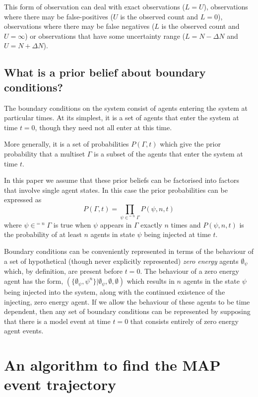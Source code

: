 \documentclass{article}
\begin{document}
This form of observation can deal with exact observations ($L=U$), observations where there may be false-positives ($U$ is the observed count and $L=0$), observations where there may be false negatives ($L$ is the observed count and $U=\infty$) or observations that have some uncertainty range ($L = N - \Delta N$ and $U = N + \Delta N$).
 
\subsection{What is a prior belief about boundary conditions?}

The boundary conditions on the system consist of agents entering the system at particular times. At its simplest, it is a set of agents that enter the system at time $t=0$, though they need not all enter at this time.

More generally, it is a set of probabilities $P(\Gamma,t)$ which give the prior probability that a multiset $\Gamma$ is a subset of the agents that enter the system at time $t$.

In this paper we assume that these prior beliefs can be factorised into factors that involve single agent states. In this case the prior probabilities can be expressed as
\[
P(\Gamma,t) = \prod_{\psi \in^{=n} \Gamma} P(\psi,n,t)
\]
where $\psi\in^{=n}\Gamma$ is true when $\psi$ appears in $\Gamma$ exactly $n$ times and $P(\psi,n,t)$ is the probability of at least $n$ agents in state $\psi$ being injected at time $t$. 

Boundary conditions can be conveniently represented in terms of the behaviour of a set of hypothetical (though never explicitly represented) \textit{zero energy} agents $\emptyset_\psi$ which, by definition, are present before $t=0$. The behaviour of a zero energy agent has the form, $(\{\emptyset_\psi, \psi^n\}|\emptyset_\psi,\emptyset,\emptyset)$ which results in $n$ agents in the state $\psi$ being injected into the system, along with the continued existence of the injecting, zero energy agent. If we allow the behaviour of these agents to be time dependent, then any set of boundary conditions can be represented by supposing that there is a model event at time $t=0$ that consists entirely of zero energy agent events.



\section{An algorithm to find the MAP event trajectory}
\end{document}

